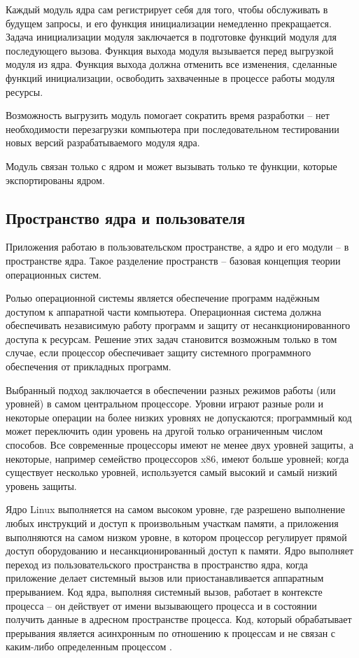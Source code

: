 Каждый модуль ядра сам регистрирует себя для того, чтобы обслуживать в будущем запросы, и его функция инициализации немедленно прекращается. Задача инициализации модуля заключается в подготовке функций модуля для последующего вызова. Функция выхода модуля вызывается перед выгрузкой модуля из ядра. Функция выхода должна отменить все изменения, сделанные функций инициализации, освободить захваченные в процессе работы модуля ресурсы. 

Возможность выгрузить модуль помогает сократить время разработки -- нет необходимости перезагрузки компьютера при последовательном тестировании новых версий разрабатываемого модуля ядра.

Модуль связан только с ядром и может вызывать только те функции, которые экспортированы ядром.

\subsection{Пространство ядра и пользователя}

Приложения работаю в пользовательском пространстве, а ядро и его модули -- в пространстве ядра. Такое разделение пространств -- базовая концепция теории операционных систем.

Ролью операционной системы является обеспечение программ надёжным доступом к аппаратной части компьютера. Операционная система должна обеспечивать независимую работу программ и защиту от несанкционированного доступа к ресурсам. Решение этих задач становится возможным только в том случае, если процессор обеспечивает защиту системного программного обеспечения от прикладных программ.

Выбранный подход заключается в обеспечении разных режимов работы (или уровней) в самом центральном процессоре. Уровни играют разные роли и некоторые операции на более низких уровнях не допускаются; программный код может переключить один уровень на другой только ограниченным числом способов. Все современные процессоры имеют не менее двух уровней защиты, а некоторые, например семейство процессоров x86, имеют больше уровней; когда существует несколько уровней, используется самый высокий и самый низкий уровень защиты. 

Ядро Linux выполняется на самом высоком уровне, где разрешено выполнение любых инструкций и доступ к произвольным участкам памяти, а приложения выполняются на самом низком уровне, в котором процессор регулирует прямой доступ оборудованию и несанкционированный доступ к памяти. Ядро выполняет переход из пользовательского пространства в пространство ядра, когда приложение делает системный вызов или приостанавливается аппаратным прерыванием. Код ядра, выполняя системный вызов, работает в контексте процесса -- он действует от имени вызывающего процесса и в состоянии получить данные в адресном пространстве процесса. Код, который обрабатывает прерывания является асинхронным по отношению к процессам и не связан с каким-либо определенным процессом \cite{habr-profiling-linux}.


